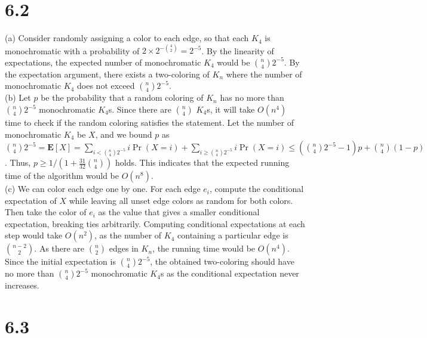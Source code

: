 \documentclass{article}
\begin{document}
\section*{6.2}
(a) Consider randomly assigning a color to each edge, so that each $K_4$ is monochromatic with a probability of $2\times2^{-\binom{4}{2}}=2^{-5}$.
By the linearity of expectations, the expected number of monochromatic $K_4$ would be $\binom{n}{4}2^{-5}$.
By the expectation argument, there exists a two-coloring of $K_n$ where the number of monochromatic $K_4$ does not exceed $\binom{n}{4}2^{-5}$.\\
(b) Let $p$ be the probability that a random coloring of $K_n$ has no more than $\binom{n}{4}2^{-5}$ monochromatic $K_4$s.
Since there are $\binom{n}{4}$ $K_4$s, it will take $O(n^4)$ time to check if the random coloring satisfies the statement.
Let the number of monochromatic $K_4$ be $X$, and we bound $p$ as $\binom{n}{4}2^{-5}=\textbf{E}[X]=\sum\limits_{i<\binom{n}{4}2^{-5}}i\Pr(X=i)+\sum\limits_{i\geq\binom{n}{4}2^{-5}}i\Pr(X=i)\leq \left(\binom{n}{4}2^{-5}-1\right)p+\binom{n}{4}(1-p)$.
Thus, $p \geq 1/(1+\frac{31}{32}\binom{n}{4})$ holds.
This indicates that the expected running time of the algorithm would be $O(n^8)$.\\
(c) We can color each edge one by one.
For each edge $e_i$, compute the conditional expectation of $X$ while leaving all unset edge colors as random for both colors.
Then take the color of $e_i$ as the value that gives a smaller conditional expectation, breaking ties arbitrarily.
Computing conditional expectations at each step would take $O(n^2)$, as the number of $K_4$ containing a particular edge is $\binom{n-2}{2}$.
As there are $\binom{n}{2}$ edges in $K_n$, the running time would be $O(n^4)$.
Since the initial expectation is $\binom{n}{4}2^{-5}$, the obtained two-coloring should have no more than $\binom{n}{4}2^{-5}$ monochromatic $K_4$s as the conditional expectation never increases.
\section*{6.3}
\end{document}
